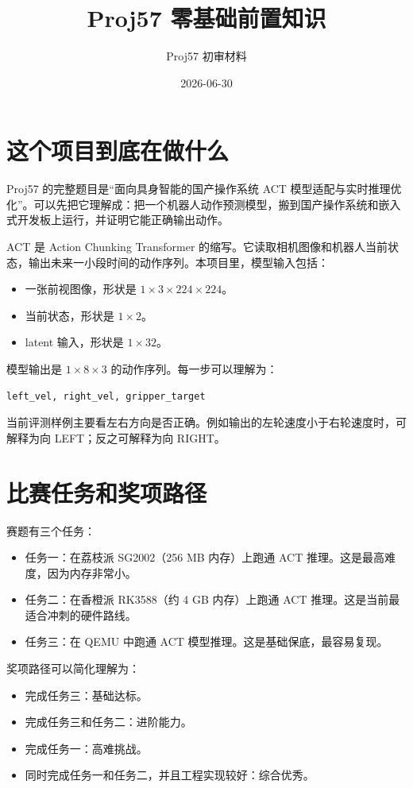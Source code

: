 \documentclass[UTF8,a4paper,11pt]{ctexart}
\title{Proj57 零基础前置知识}
\author{Proj57 初审材料}
\date{2026-06-30}
\begin{document}
\maketitle

\section{这个项目到底在做什么}

Proj57 的完整题目是“面向具身智能的国产操作系统 ACT 模型适配与实时推理优化”。可以先把它理解成：把一个机器人动作预测模型，搬到国产操作系统和嵌入式开发板上运行，并证明它能正确输出动作。

ACT 是 Action Chunking Transformer 的缩写。它读取相机图像和机器人当前状态，输出未来一小段时间的动作序列。本项目里，模型输入包括：

\begin{itemize}
  \item 一张前视图像，形状是 $1 \times 3 \times 224 \times 224$。
  \item 当前状态，形状是 $1 \times 2$。
  \item latent 输入，形状是 $1 \times 32$。
\end{itemize}

模型输出是 $1 \times 8 \times 3$ 的动作序列。每一步可以理解为：

\begin{verbatim}
left_vel, right_vel, gripper_target
\end{verbatim}

当前评测样例主要看左右方向是否正确。例如输出的左轮速度小于右轮速度时，可解释为向 LEFT；反之可解释为向 RIGHT。

\section{比赛任务和奖项路径}

赛题有三个任务：

\begin{itemize}
  \item 任务一：在荔枝派 SG2002（256 MB 内存）上跑通 ACT 推理。这是最高难度，因为内存非常小。
  \item 任务二：在香橙派 RK3588（约 4 GB 内存）上跑通 ACT 推理。这是当前最适合冲刺的硬件路线。
  \item 任务三：在 QEMU 中跑通 ACT 模型推理。这是基础保底，最容易复现。
\end{itemize}

奖项路径可以简化理解为：

\begin{itemize}
  \item 完成任务三：基础达标。
  \item 完成任务三和任务二：进阶能力。
  \item 完成任务一：高难挑战。
  \item 同时完成任务一和任务二，并且工程实现较好：综合优秀。
\end{itemize}
\end{document}
